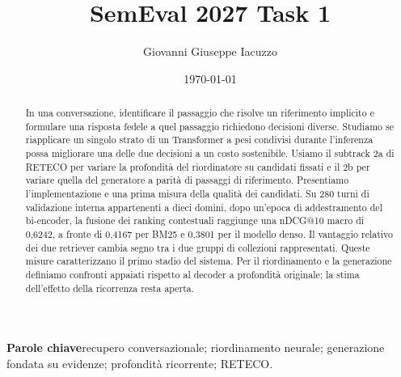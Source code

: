 \documentclass[11pt,a4paper]{article}
\title{SemEval 2027 Task 1}
\author{Giovanni Giuseppe Iacuzzo}
\date{\today}
\begin{document}
\maketitle

\begin{abstract}
In una conversazione, identificare il passaggio che risolve un riferimento implicito e formulare una risposta fedele a quel passaggio richiedono decisioni diverse. Studiamo se riapplicare un singolo strato di un Transformer a pesi condivisi durante l'inferenza possa migliorare una delle due decisioni a un costo sostenibile. Usiamo il subtrack 2a di RETECO per variare la profondità del riordinatore su candidati fissati e il 2b per variare quella del generatore a parità di passaggi di riferimento. Presentiamo l'implementazione e una prima misura della qualità dei candidati. Su 280 turni di validazione interna appartenenti a dieci domini, dopo un'epoca di addestramento del bi-encoder, la fusione dei ranking contestuali raggiunge una nDCG@10 macro di 0,6242, a fronte di 0,4167 per BM25 e 0,3801 per il modello denso. Il vantaggio relativo dei due retriever cambia segno tra i due gruppi di collezioni rappresentati. Queste misure caratterizzano il primo stadio del sistema. Per il riordinamento e la generazione definiamo confronti appaiati rispetto al decoder a profondità originale; la stima dell'effetto della ricorrenza resta aperta.
\end{abstract}
\noindent\textbf{Parole chiave}\quad recupero conversazionale; riordinamento neurale; generazione fondata su evidenze; profondità ricorrente; RETECO.










\end{document}

